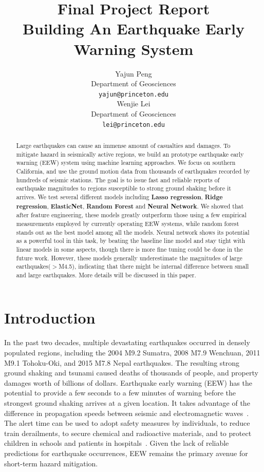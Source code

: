 \documentclass{article} %
\title{Final Project Report \\Building An Earthquake Early Warning System}
\author{
Yajun Peng\\
Department of Geosciences\\
\texttt{yajun@princeton.edu} \\
\And
Wenjie Lei \\
Department of Geosciences \\
\texttt{lei@princeton.edu} \\
}
\begin{document}
\maketitle

\begin{abstract}
  Large earthquakes can cause an immense amount of casualties and damages. To mitigate hazard in seismically active regions, we build an prototype earthquake early warning (EEW) system using machine learning approaches. We focus on southern California, and use the ground motion data from thousands of earthquakes recorded by hundreds of seismic stations. The goal is to issue fast and reliable reports of earthquake magnitudes to regions susceptible to strong ground shaking before it arrives. We test several different models including \textbf{Lasso regression}, \textbf{Ridge regression}, \textbf{ElasticNet}, \textbf{Random Forest} and \textbf{Neural Network}. We showed that after feature engineering, these models greatly outperform those using a few empirical measurements employed by currently operating EEW systems, while random forest stands out as the best model among all the models. Neural network shows its potential as a powerful tool in this task, by beating the baseline line model and stay tight with linear models in some aspects, though there is more fine tuning could be done in the future work. However, these models generally underestimate the magnitudes of large earthquakes($>$M4.5), indicating that there might be internal difference between small and large earthquakes. More details will be discussed in this paper.

\end{abstract}

\section{Introduction}
In the past two decades, multiple devastating earthquakes occurred in densely populated regions, including the 2004 M9.2 Sumatra, 2008 M7.9 Wenchuan, 2011 M9.1 Tohoku-Oki, and 2015 M7.8 Nepal earthquakes. The resulting strong ground shaking and tsunami caused deaths of thousands of people, and property damages worth of billions of dollars. Earthquake early warning (EEW) has the potential to provide a few seconds to
a few minutes of warning before the strongest ground shaking arrives at a given
location. It takes advantage of the difference in propagation speeds between seismic and
electromagnetic waves~\cite{Allen2009, Bose2009}. The alert time can be used to adopt safety measures by individuals, to reduce train derailments, to secure chemical and radioactive materials, and to protect children in schools and patients in hospitals~\cite{Strauss2016}. Given the lack of reliable predictions for earthquake occurrences, EEW remains the primary avenue for short-term hazard mitigation. 
\end{document}

